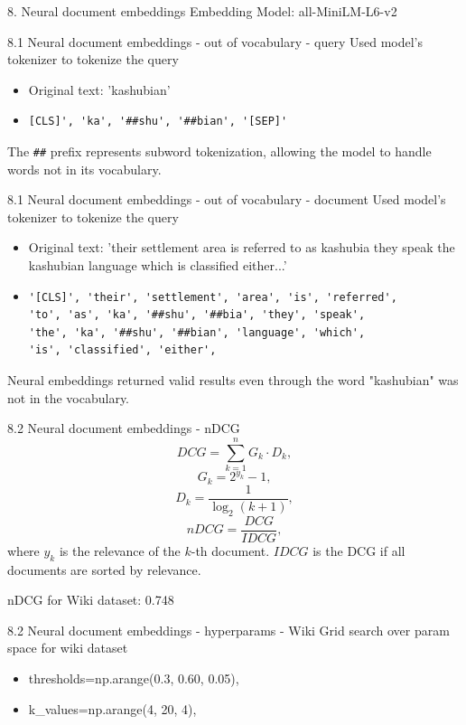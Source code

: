 \documentclass{beamer}
\begin{document}
\begin{frame}{8. Neural document embeddings}
  Embedding Model: all-MiniLM-L6-v2
\end{frame}

\begin{frame}[fragile]{8.1 Neural document embeddings - out of vocabulary - query}
  Used model's tokenizer to tokenize the query
  \begin{itemize}
    \item Original text: 'kashubian'
    \item \begin{verbatim}[CLS]', 'ka', '##shu', '##bian', '[SEP]'\end{verbatim}
  \end{itemize}
  The \verb|##| prefix represents subword tokenization, allowing the model to handle words not in its vocabulary.
\end{frame}
\begin{frame}[fragile]{8.1 Neural document embeddings - out of vocabulary - document}
  Used model's tokenizer to tokenize the query
  \begin{itemize}
    \item Original text: 'their settlement area is referred to as kashubia they speak the kashubian language which is classified either...'
    \item \begin{verbatim}
'[CLS]', 'their', 'settlement', 'area', 'is', 'referred',
'to', 'as', 'ka', '##shu', '##bia', 'they', 'speak',
'the', 'ka', '##shu', '##bian', 'language', 'which',
'is', 'classified', 'either',\end{verbatim}
  \end{itemize}
  Neural embeddings returned valid results even through the word "kashubian" was not in the vocabulary.
\end{frame}


\begin{frame}{8.2 Neural document embeddings - nDCG}
  \[ DCG = \sum_{k=1}^{n} G_k \cdot D_k,\]
  \[G_k = 2^{y_k} - 1 , \]
  \[D_k = \frac{1}{\log_2(k+1)},  \]
  \[nDCG = \frac{DCG}{IDCG},\]
  where $y_k$ is the relevance of the $k$-th document.
  $IDCG$ is the DCG if all documents are sorted by relevance.

  nDCG for Wiki dataset: 0.748
\end{frame}


\begin{frame}{8.2 Neural document embeddings - hyperparams - Wiki}
  Grid search over param space for wiki dataset
  \begin{itemize}
    \item thresholds=np.arange(0.3, 0.60, 0.05),
    \item k\_values=np.arange(4, 20, 4),
  \end{itemize}
\end{frame}
\end{document}
